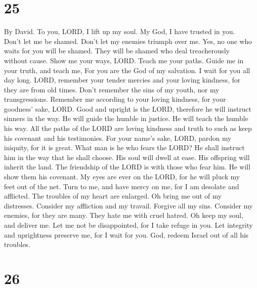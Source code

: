 \hypertarget{section-24}{%
\section{25}\label{section-24}}

By David.  To you, LORD, I lift up my soul. 
My God, I have trusted in you. Don't let me be shamed. Don't let my
enemies triumph over me.  Yes, no one who waits for you
will be shamed. They will be shamed who deal treacherously without
cause.  Show me your ways, LORD. Teach me your paths.
 Guide me in your truth, and teach me, For you are the God
of my salvation. I wait for you all day long.  LORD,
remember your tender mercies and your loving kindness, for they are from
old times.  Don't remember the sins of my youth, nor my
transgressions. Remember me according to your loving kindness, for your
goodness' sake, LORD.  Good and upright is the LORD,
therefore he will instruct sinners in the way.  He will
guide the humble in justice. He will teach the humble his way.
 All the paths of the LORD are loving kindness and truth
to such as keep his covenant and his testimonies.  For
your name's sake, LORD, pardon my iniquity, for it is great.
 What man is he who fears the LORD? He shall instruct him
in the way that he shall choose.  His soul will dwell at
ease. His offspring will inherit the land.  The
friendship of the LORD is with those who fear him. He will show them his
covenant.  My eyes are ever on the LORD, for he will
pluck my feet out of the net.  Turn to me, and have mercy
on me, for I am desolate and afflicted.  The troubles of
my heart are enlarged. Oh bring me out of my distresses. 
Consider my affliction and my travail. Forgive all my sins.
 Consider my enemies, for they are many. They hate me
with cruel hatred.  Oh keep my soul, and deliver me. Let
me not be disappointed, for I take refuge in you.  Let
integrity and uprightness preserve me, for I wait for you.
 God, redeem Israel out of all his troubles.

\hypertarget{section-25}{%
\section{26}\label{section-25}}

